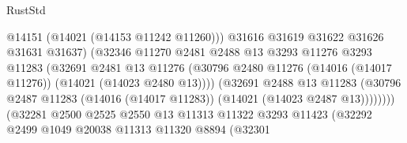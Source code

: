 \begin{lexlean}{RustStd}
\begin{coremodule}
                                            @14151
                                            (@14021 (@14153 @11242 @11260)))
                                          @31616
                                          @31619
                                          @31622
                                          @31626
                                          @31631
                                          @31637)
                                        (@32346
                                          @11270
                                          @2481
                                          @2488
                                          @13
                                          @3293
                                          @11276
                                          @3293
                                          @11283
                                          (@32691
                                            @2481
                                            @13
                                            @11276
                                            (@30796
                                              @2480
                                              @11276
                                              (@14016 (@14017 @11276))
                                              (@14021 (@14023 @2480 @13))))
                                          (@32691
                                            @2488
                                            @13
                                            @11283
                                            (@30796
                                              @2487
                                              @11283
                                              (@14016 (@14017 @11283))
                                              (@14021 (@14023 @2487 @13))))))))
                                  (@32281
                                    @2500
                                    @2525
                                    @2550
                                    @13
                                    @11313
                                    @11322
                                    @3293
                                    @11423
                                    (@32292
                                      @2499
                                      @1049
                                      @20038
                                      @11313
                                      @11320
                                      @8894
                                      (@32301

\end{coremodule}
\end{lexlean}
